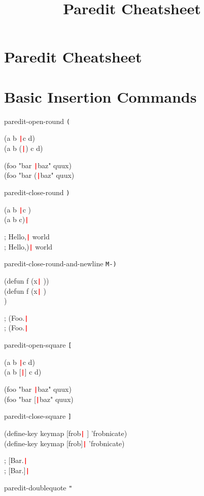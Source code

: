 \documentclass[landscape,a3paper]{article}
\title{Paredit Cheatsheet}
\begin{document}
  \newcommand{\cursor}{\texttt{\textcolor{red}{\textbf{|}}}}

  \begin{multicols}{4}

    \section*{\LARGE{Paredit Cheatsheet}}

    \section*{Basic Insertion Commands}

paredit-open-round \texttt{(}

\ttfamily
(a b \cursor c d)\\
(a b (\cursor) c d)

(foo "bar \cursor baz" quux)\\
(foo "bar (\cursor baz" quux)
\rmfamily

paredit-close-round \texttt{)}

\ttfamily
(a b \cursor c \space\space)\\
(a b c)\cursor

; Hello,\cursor{} world\\
; Hello,)\cursor{} world
\rmfamily

paredit-close-round-and-newline \texttt{M-)}

\ttfamily
(defun f (x\cursor{} \space))\\
(defun f (x\cursor{} \space)\\
)

; (Foo.\cursor\\
; (Foo.\cursor
\rmfamily

paredit-open-square \texttt{[}

\ttfamily
(a b \cursor c d)\\
(a b [\cursor] c d)

(foo "bar \cursor baz" quux)\\
(foo "bar [\cursor baz" quux)
\rmfamily

paredit-close-square \texttt{]}

\ttfamily
(define-key keymap [frob\cursor{} \space] 'frobnicate)\\
(define-key keymap [frob]\cursor{} 'frobnicate)

; [Bar.\cursor\\
; [Bar.]\cursor
\rmfamily

paredit-doublequote \texttt{"}


\end{multicols}
\end{document}
